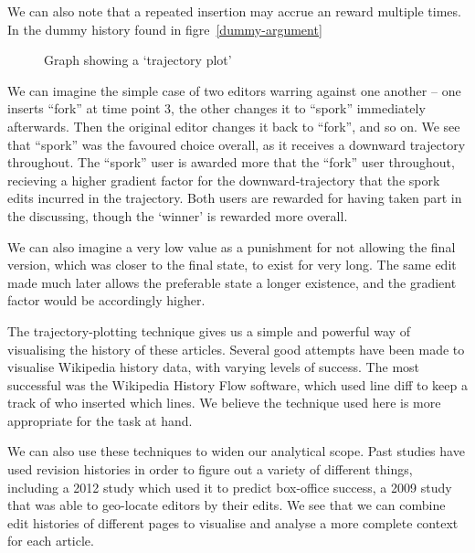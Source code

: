 We can also note that a repeated insertion may accrue an reward
multiple times. In the dummy history found in figre~\ref{dummy-argument}

\begin{wrapfigure}{i}{0.4\textwidth}
  \centering
  \pgfplotsset{width=0.4\textwidth}
  \caption{Graph showing a `trajectory plot'}
  \label{fig:dummy-history}
\end{wrapfigure}

We can imagine the simple case of two editors warring against one
another -- one inserts ``fork'' at time point 3, the other changes it
to ``spork'' immediately afterwards. Then the original editor changes
it back to ``fork'', and so on. We see that ``spork'' was the favoured
choice overall, as it receives a downward trajectory throughout. The
``spork'' user is awarded more that the ``fork'' user throughout,
recieving a higher gradient factor for the downward-trajectory that
the spork edits incurred in the trajectory. Both users are rewarded
for having taken part in the discussing, though the `winner' is
rewarded more overall.

We can also imagine a very low value as a punishment for not allowing
the final version, which was closer to the final state, to exist for
very long. The same edit made much later allows the preferable state a
longer existence, and the gradient factor would be accordingly higher. 

The trajectory-plotting technique gives us a simple and powerful way
of visualising the history of these articles. Several good attempts
have been made to visualise Wikipedia history data, with varying
levels of
success.\cite{Chi2008}\cite{Sabel2007}\cite{Suh2007}\cite{Wu2013}\cite{Viegas2004}
The most successful was the Wikipedia History Flow
software,\cite{iphylo-history}\cite{wiki-history-flow} which used line
diff to keep a track of who inserted which lines. We believe the
technique used here is more appropriate for the task at hand.

We can also use these techniques to widen our analytical scope. Past
studies have used revision histories in order to figure out a variety
of different things, including a 2012 study which used it to predict
box-office success,\cite{Mestyan2012} a 2009 study that was able to
geo-locate editors by their edits.\cite{Lieberman2009} We see that we
can combine edit histories of different pages to visualise and analyse
a more complete context for each article.

